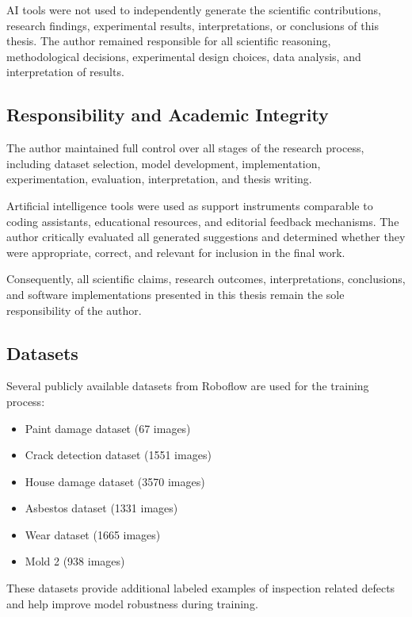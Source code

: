 AI tools were not used to independently generate the scientific contributions, research findings, experimental results, interpretations, or conclusions of this thesis. The author remained responsible for all scientific reasoning, methodological decisions, experimental design choices, data analysis, and interpretation of results.

\subsection{Responsibility and Academic Integrity}

The author maintained full control over all stages of the research process, including dataset selection, model development, implementation, experimentation, evaluation, interpretation, and thesis writing.

Artificial intelligence tools were used as support instruments comparable to coding assistants, educational resources, and editorial feedback mechanisms. The author critically evaluated all generated suggestions and determined whether they were appropriate, correct, and relevant for inclusion in the final work.

Consequently, all scientific claims, research outcomes, interpretations, conclusions, and software implementations presented in this thesis remain the sole responsibility of the author.

%                          
\subsection{ Datasets}
Several publicly available datasets from Roboflow are used for the training process:

\begin{itemize}
    \item Paint damage dataset (67 images)
    \item Crack detection dataset (1551 images)
    \item House damage dataset (3570 images)
    \item Asbestos dataset (1331 images)
    \item Wear dataset (1665 images)
    \item Mold 2 (938 images)
\end{itemize}

These datasets provide additional labeled examples of inspection related defects and help improve model robustness during training.
